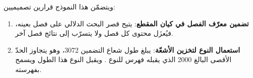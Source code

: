 ويتضمّن هذا النموذج قرارين تصميميين:

\begin{enumerate}
  \item \textbf{تضمين معرّف الفصل في كيان المقطع}: يتيح قصر البحث الدلالي على فصل بعينه، فيُعزَل محتوى كل فصل ولا يتسرّب إلى نتائج فصل آخر.
  \item \textbf{استعمال النوع  لتخزين الأشعّة}: يبلغ طول شعاع التضمين 3072، وهو يتجاوز الحدّ الأقصى البالغ 2000 الذي يقبله فهرس  للنوع . ويقبل النوع  هذا الطول ويسمح بفهرسته.
\end{enumerate}

